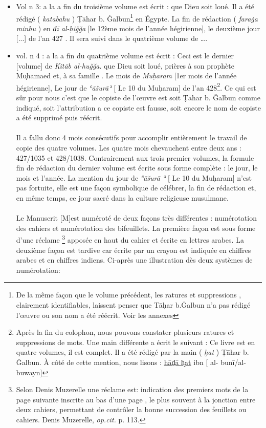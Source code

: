 \documentclass[a4paper,12pt]{report}
\begin{document}
\begin{itemize}
\begin{enumerate}
\begin{itemize}
    \item 	 Vol n 3: a la a fin du troisième volume est écrit :  que Dieu soit loué. Il a été rédigé ( \textit{katabahu} )  Ṭāhar b. Ġalbun\footnote{De la même façon que le volume précédent, les ratures et suppressions , clairement identifiables, laissent penser que  Tāḥar b.Ġalbun  n’a pas rédigé l’œuvre ou son nom a été réécrit. Voir les annexes } en Égypte. La fin de rédaction ( \textit{faraġa minhu} ) en \textit{d̠ī al-ḥiǧǧa} [le 12ème mois de l’année hégirienne], le deuxième jour [...]  de l’an 427 . Il sera suivi dans le quatrième volume de …. 
 \item vol. n 4 : a la a fin du quatrième  volume est écrit :  Ceci est  le dernier [volume] de \textit{Kitāb al-huǧǧa}. que Dieu soit loué, prières à son prophète Moͅhamaed et, à  sa famille  . Le mois de \textit{Muḥaram} [1er mois de l’année hégirienne], Le jour de 
\textit{ʿāšurāʾ} [ Le 10  du Muḥaram]  de l’an 428\footnote{Après la fin du colophon, nous pouvons constater  plusieurs ratures et suppressions de mots.  Une main différente a écrit le suivant : Ce livre est en quatre volumes, il est complet. Il a été rédigé par la main (\textit{ ḫat} ) Ṭāhar b. Ǧalbun.  À côté de cette mention, nous lisons :  \underline{hād̠ā h̬at} ibn [ al- bunī/al-buwayn] }. Ce qui est sûr pour nous c'est que le copiste de l'œuvre est soit Ṭāhar b. Ǧalbun comme indiqué, soit l'attribution a ce copiste est fausse, soit encore le nom de copiste a été supprimé puis réécrit. 
\paragraph{}

Il a fallu donc 4 mois consécutifs  pour accomplir  entièrement le travail de copie des quatre volumes.  Les quatre mois chevauchent entre deux ans : 427/1035 et 428/1038. Contrairement aux trois premier volumes, la formule fin de rédaction du dernier volume est  écrite sous forme complète :  le jour, le mois et l’année.  
La mention du jour de \textit{ʿāšurā ʾ} [ Le 10  du Muḥaram]  n’est pas fortuite, elle est une façon symbolique de célébrer, la fin de rédaction et, en même temps, ce jour sacré dans la culture religieuse musulmane.   
\paragraph{}
Le Manuscrit  [M]est numéroté de deux façons très différentes : numérotation des cahiers et numérotation des bifeuillets. La première façon est sous forme d’une réclame \footnote{Selon Denis Muzerelle une réclame est: indication des premiers mots de la page suivante inscrite au bas d’une page , le plus souvent à la jonction entre deux cahiers, permettant de contrôler la bonne succession des feuillets  ou cahiers. Denis Muzerelle,\textit{ op.cit.} p. 113.  } apposée en haut du cahier et écrite  en  lettres arabes.  La deuxième façon  est  tardive car écrite par un crayon  est indiquée en  chiffres arabes et en chiffres indiens. Ci-après une illustration dès deux systèmes de numérotation: 


\end{itemize}
\end{enumerate}
\end{itemize}
\end{document}
